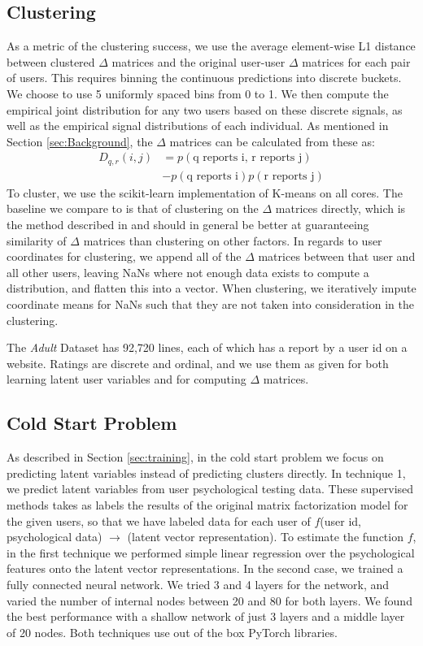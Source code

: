 \documentclass{article}
\begin{document}
\subsection{Clustering} As a metric of the clustering success, we use the average element-wise L1 distance between clustered $\Delta$ matrices and the original user-user $\Delta$ matrices for each pair of users. This requires binning the continuous predictions into discrete buckets. We choose to use 5 uniformly spaced bins from 0 to 1. We then compute the empirical joint distribution for any two users based on these discrete signals, as well as the empirical signal distributions of each individual. As mentioned in Section \ref{sec:Background}, the $\Delta$ matrices can be calculated from these as:
\begin{align*}
D_{q,r}(i,j) &= p(\textrm{q reports i, r reports j}) \\
&- p(\textrm{q reports i})p(\textrm{r reports j})
\end{align*}
To cluster, we use the scikit-learn implementation of K-means on all cores. The baseline we compare to is that of clustering on the $\Delta$ matrices directly, which is the method described in \citet{agarwal2017} and should in general be better at guaranteeing similarity of $\Delta$ matrices than clustering on other factors. In regards to user coordinates for clustering, we append all of the $\Delta$ matrices between that user and all other users, leaving NaNs where not enough data exists to compute a distribution, and flatten this into a vector. When clustering, we iteratively impute coordinate means for NaNs such that they are not taken into consideration in the clustering. 

The \emph{Adult} Dataset has 92,720 lines, each of which has a report by a user id on a website. Ratings are discrete and ordinal, and we use them as given for both learning latent user variables and for computing $\Delta$ matrices.

\subsection{Cold Start Problem}

As described in Section \ref{sec:training}, in the cold start problem we focus on predicting latent variables instead of predicting clusters directly. In technique 1, we predict latent variables from user psychological testing data. These supervised methods takes as labels the results of the original matrix factorization model for the given users, so that we have labeled data for each user of $f$(user id, psychological data) $\rightarrow$ (latent vector representation). To estimate the function $f$, in the first technique we performed simple linear regression over the psychological features onto the latent vector representations. In the second case, we trained a fully connected neural network. We tried 3 and 4 layers for the network, and varied the number of internal nodes between 20 and 80 for both layers. We found the best performance with a shallow network of just 3 layers and a middle layer of 20 nodes. Both techniques use out of the box PyTorch libraries. 
\end{document}
